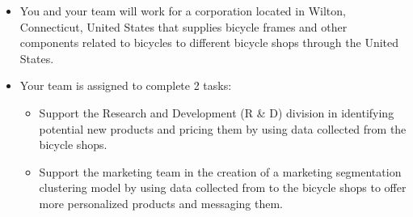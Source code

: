 \documentclass[
  ignorenonframetext,
]{beamer}
\begin{document}
\begin{frame}{}
\label{section-2}
\begin{itemize}
\item
  You and your team will work for a corporation located in Wilton,
  Connecticut, United States that supplies bicycle frames and other
  components related to bicycles to different bicycle shops through the
  United States.
\item
  Your team is assigned to complete 2 tasks:

  \begin{itemize}
  \item
    Support the Research and Development (R \& D) division in
    identifying potential new products and pricing them by using data
    collected from the bicycle shops.
  \item
    Support the marketing team in the creation of a marketing
    segmentation clustering model by using data collected from to the
    bicycle shops to offer more personalized products and messaging
    them.
  \end{itemize}
\end{itemize}
\end{frame}
\end{document}
